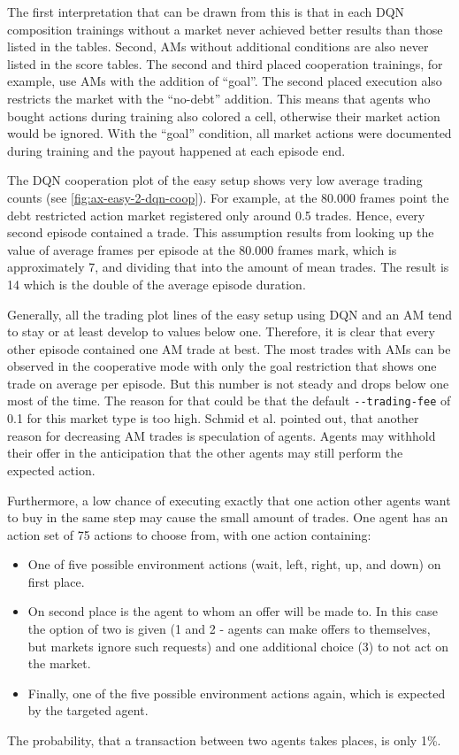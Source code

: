 The first interpretation that can be drawn from this is that in each DQN composition trainings without a market never achieved better results than those listed in the tables. Second, AMs without additional conditions are also never listed in the score tables. The second and third placed cooperation trainings, for example, use AMs with the addition of ``goal''. The second placed execution also restricts the market with the ``no-debt'' addition. This means that agents who bought actions during training also colored a cell, otherwise their market action would be ignored. With the ``goal'' condition, all market actions were documented during training and the payout happened at each episode end.

The DQN cooperation plot of the easy setup shows very low average trading counts (see \ref{fig:ax-easy-2-dqn-coop}). For example, at the 80.000 frames point the debt restricted action market registered only around 0.5 trades. Hence, every second episode contained a trade. This assumption results from looking up the value of average frames per episode at the 80.000 frames mark, which is approximately 7, and dividing that into the amount of mean trades. The result is 14 which is the double of the average episode duration. 

Generally, all the trading plot lines of the easy setup using DQN and an AM tend to stay or at least develop to values below one. Therefore, it is clear that every other episode contained one AM trade at best. The most trades with AMs can be observed in the cooperative mode with only the goal restriction that shows one trade on average per episode. But this number is not steady and drops below one most of the time. The reason for that could be that the default \verb|--trading-fee| of 0.1 for this market type is too high. Schmid et al. \cite{scbe18} pointed out, that another reason for decreasing AM trades is speculation of agents. Agents may withhold their offer in the anticipation that the other agents may still perform the expected action.

Furthermore, a low chance of executing exactly that one action other agents want to buy in the same step may cause the small amount of trades. One agent has an action set of 75 actions to choose from, with one action containing:
\begin{itemize}
    \item One of five possible environment actions (wait, left, right, up, and down) on first place.
    \item On second place is the agent to whom an offer will be made to. In this case the option of two is given (1 and 2 - agents can make offers to themselves, but markets ignore such requests) and one additional choice (3) to not act on the market.
    \item Finally, one of the five possible environment actions again, which is expected by the targeted agent.
\end{itemize}
The probability, that a transaction between two agents takes places, is only 1\%. 


